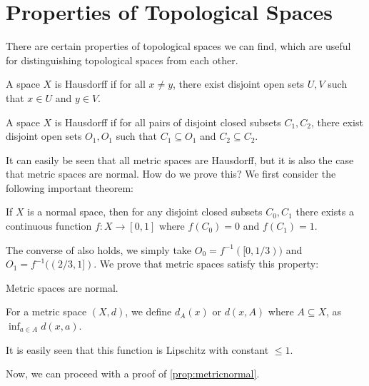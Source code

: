 \section{Properties of Topological Spaces}



There are certain properties of topological spaces we can find, which are useful for distinguishing topological spaces from each other. 

\begin{definition}[Hausdorff ($T_2$)]
    A space $X$ is Hausdorff if for all $x \ne y$, there exist disjoint open sets $U, V$ such that $x \in U$ and $y \in V$.
\end{definition}

\begin{definition}[Normal ($T_4$)]
    A space $X$ is Hausdorff if for all pairs of disjoint closed subsets $C_1, C_2$, there exist disjoint open sets $O_1, O_1$ such that $C_1 \subseteq O_1$ and $C_2 \subseteq C_2$.
\end{definition}

It can easily be seen that all metric spaces are Hausdorff, but it is also the case that metric spaces are normal. How do we prove this? We first consider the following important theorem:

\begin{theorem}
    \label{thm:urysohnlemma}
    If $X$ is a normal space, then for any disjoint closed subsets $C_0, C_1$ there exists a continuous function $f\colon X \to [0, 1]$ where $f(C_0) = 0$ and $f(C_1) = 1$.
\end{theorem}

The converse of  also holds, we simply take $O_0 = f^{-1}([0, 1/3))$ and $O_1 = f^{-1}((2/3, 1])$. We prove that metric spaces satisfy this property:

\begin{proposition}
    \label{prop:metricnormal}
    Metric spaces are normal.
\end{proposition}

\begin{definition}
    For a metric space $(X, d)$, we define $d_A(x)$ or $d(x, A)$ where $A \subseteq X$, as $\inf_{a \in A} d(x, a)$.
\end{definition}

It is easily seen that this function is Lipschitz with constant $\le 1$.

Now, we can proceed with a proof of \autoref{prop:metricnormal}.

